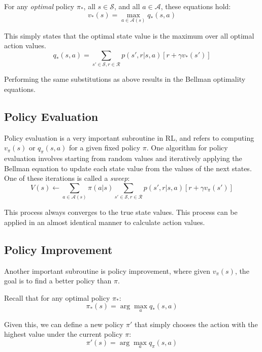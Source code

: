 \documentclass{article}
\begin{document}
For any \emph{optimal} policy $\pi_*$, all $s \in \mathcal{S}$, and all $a \in \mathcal{A}$, these equations hold:
\begin{equation}
  v_*(s) = \max_{a \in \mathcal{A}(s)} q_*(s,a)
\end{equation}

This simply states that the optimal state value is the maximum over all optimal action values.
\begin{equation}
  q_*(s,a) = \sum_{s' \in \mathcal{S}, r \in \mathcal{R}} p(s',r|s,a)[r + \gamma v_*(s')]
\end{equation}

Performing the same substitutions as above results in the Bellman optimality equations.

\subsection{Policy Evaluation}
Policy evaluation is a very important subroutine in RL, and refers to computing $v_\pi(s)$ or $q_\pi(s,a)$ for a given fixed policy $\pi$.
One algorithm for policy evaluation involves starting from random values and iteratively applying the Bellman equation to update each state value from the values of
the next states. One of these iterations is called a \emph{sweep}:
\begin{equation}
  V(s) \leftarrow \sum_{a \in \mathcal{A}(s)} \pi(a|s) \sum_{s' \in \mathcal{S}, r \in \mathcal{R}} p(s',r|s,a)[r + \gamma v_\pi(s')]
\end{equation}

This process always converges to the true state values. This process can be applied in an almost identical manner to calculate action values.

\subsection{Policy Improvement}
Another important subroutine is policy improvement, where given $v_\pi(s)$, the goal is to find a better policy than $\pi$.

Recall that for any optimal policy $\pi_*$:
\begin{equation*}
  \pi_*(s) = \arg \max_a q_*(s,a)
\end{equation*}

Given this, we can define a new policy $\pi'$ that simply chooses the action with the highest value under the current policy $\pi$:
\begin{equation}
  \pi'(s) = \arg \max_a q_\pi(s,a)
\end{equation}
\end{document}
